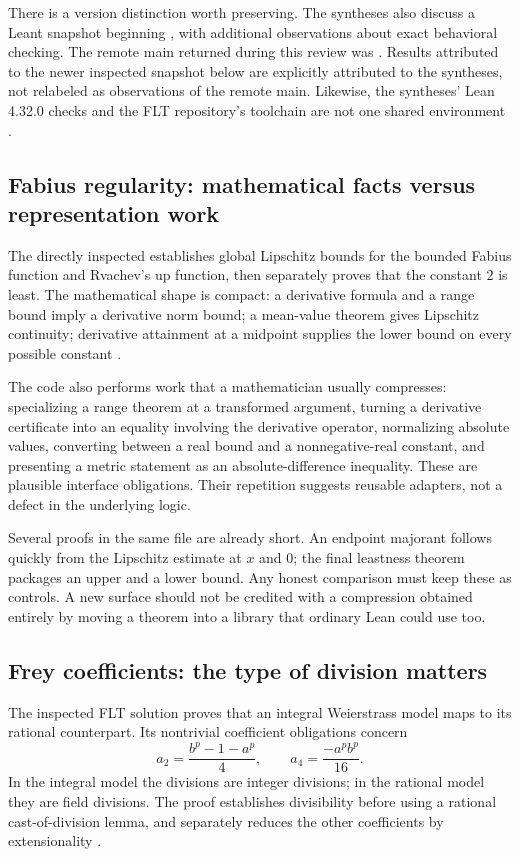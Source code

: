 \documentclass[11pt,a4paper]{article}
\newcommand{\code}[1]{\texttt{\detokenize{#1}}}
\theoremstyle{definition}
\theoremstyle{remark}
\begin{document}
There is a version distinction worth preserving. The syntheses also discuss a Leant snapshot beginning \code{823259f7}, with additional observations about exact behavioral checking. The remote main returned during this review was \code{3a40904b}. Results attributed to the newer inspected snapshot below are explicitly attributed to the syntheses, not relabeled as observations of the remote main. Likewise, the syntheses' Lean 4.32.0 checks and the FLT repository's toolchain are not one shared environment \cite{r3a,r3b,fltreadme}.

\subsection{Fabius regularity: mathematical facts versus representation work}
The directly inspected \code{Regularity.lean} establishes global Lipschitz bounds for the bounded Fabius function and Rvachev's up function, then separately proves that the constant $2$ is least. The mathematical shape is compact: a derivative formula and a range bound imply a derivative norm bound; a mean-value theorem gives Lipschitz continuity; derivative attainment at a midpoint supplies the lower bound on every possible constant \cite{regularity}.

The code also performs work that a mathematician usually compresses: specializing a range theorem at a transformed argument, turning a derivative certificate into an equality involving the derivative operator, normalizing absolute values, converting between a real bound and a nonnegative-real constant, and presenting a metric statement as an absolute-difference inequality. These are plausible interface obligations. Their repetition suggests reusable adapters, not a defect in the underlying logic.

Several proofs in the same file are already short. An endpoint majorant follows quickly from the Lipschitz estimate at $x$ and $0$; the final leastness theorem packages an upper and a lower bound. Any honest comparison must keep these as controls. A new surface should not be credited with a compression obtained entirely by moving a theorem into a library that ordinary Lean could use too.

\subsection{Frey coefficients: the type of division matters}
The inspected FLT solution proves that an integral Weierstrass model maps to its rational counterpart. Its nontrivial coefficient obligations concern
\[
 a_2=\frac{b^p-1-a^p}{4},\qquad
 a_4=\frac{-a^pb^p}{16}.
\]
In the integral model the divisions are integer divisions; in the rational model they are field divisions. The proof establishes divisibility before using a rational cast-of-division lemma, and separately reduces the other coefficients by extensionality \cite{freymap}.
\end{document}

